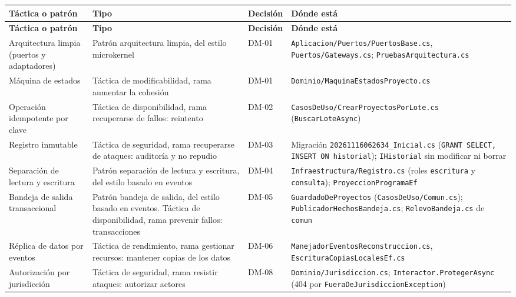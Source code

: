 \documentclass[11pt,a4paper]{article}
\begin{document}
{\small
\begin{longtable}{|P{3.0cm}|P{3.7cm}|P{1.3cm}|P{6.2cm}|}
  \hline
  \textbf{Táctica o patrón} & \textbf{Tipo} & \textbf{Decisión} & \textbf{Dónde está} \\ \hline
  \endfirsthead
  \hline
  \textbf{Táctica o patrón} & \textbf{Tipo} & \textbf{Decisión} & \textbf{Dónde está} \\ \hline
  \endhead
  Arquitectura limpia (puertos y adaptadores) & Patrón arquitectura limpia, del estilo microkernel & DM-01 & \texttt{Aplicacion/Puertos/PuertosBase.cs},
    \texttt{Puertos/Gateways.cs}; \texttt{PruebasArquitectura.cs} \\ \hline
  Máquina de estados & Táctica de modificabilidad, rama aumentar la cohesión & DM-01 & \texttt{Dominio/MaquinaEstadosProyecto.cs} \\ \hline
  Operación idempotente por clave & Táctica de disponibilidad, rama recuperarse de fallos: reintento & DM-02 & \texttt{CasosDeUso/\allowbreak CrearProyectosPorLote.cs}
    (\texttt{BuscarLoteAsync}) \\ \hline
  Registro inmutable & Táctica de seguridad, rama recuperarse de ataques: auditoría y no repudio & DM-03 & Migración \texttt{20261116062634\_Inicial.cs} (\texttt{GRANT SELECT, INSERT ON
    historial}); \texttt{IHistorial} sin modificar ni borrar \\ \hline
  Separación de lectura y escritura & Patrón separación de lectura y escritura, del estilo basado en eventos & DM-04 & \texttt{Infraestructura/Registro.cs} (roles \texttt{escritura} y
    \texttt{consulta}); \texttt{ProyeccionProgramaEf} \\ \hline
  Bandeja de salida transaccional & Patrón bandeja de salida, del estilo basado en eventos. Táctica de disponibilidad, rama prevenir fallos: transacciones & DM-05 & \texttt{GuardadoDeProyectos} (\texttt{CasosDeUso/Comun.cs});
    \texttt{PublicadorHechosBandeja.cs}; \texttt{RelevoBandeja.cs} de \texttt{comun} \\ \hline
  Réplica de datos por eventos & Táctica de rendimiento, rama gestionar recursos: mantener copias de los datos & DM-06 & \texttt{ManejadorEventos\allowbreak Reconstruccion.cs},
    \texttt{EscrituraCopiasLocalesEf.cs} \\ \hline
  Autorización por jurisdicción & Táctica de seguridad, rama resistir ataques: autorizar actores & DM-08 & \texttt{Dominio/Jurisdiccion.cs}; \texttt{Interactor.ProtegerAsync}
    (404 por \texttt{FueraDeJurisdiccionException}) \\ \hline

\end{longtable}}
\end{document}
